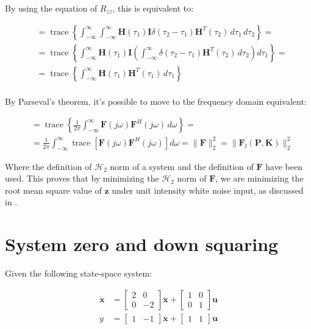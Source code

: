 \documentclass{scrreprt}
\begin{document}
By using the equation of $R_{zz}$, this is equivalent to:

\begin{align}
&= \operatorname{trace} \left\{ \int_{-\infty}^{\infty} \int_{-\infty}^{\infty} \mathbf{H}(\tau_1) \mathbf{I} \delta(\tau_2 - \tau_1) \mathbf{H}^T(\tau_2) \, d\tau_1 \, d\tau_2 \right\} = \\
&= \operatorname{trace} \left\{ \int_{-\infty}^{\infty} \mathbf{H}(\tau_1) \mathbf{I} \left( \int_{-\infty}^{\infty} \delta(\tau_2 - \tau_1) \mathbf{H}^T(\tau_2) \, d\tau_2 \right) d\tau_1 \right\} = \\
&= \operatorname{trace} \left\{ \int_{-\infty}^{\infty} \mathbf{H}(\tau_1) \mathbf{H}^T(\tau_1) \, d\tau_1 \right\} \\
\end{align}

By Parseval's theorem, it's possible to move to the frequency domain equivalent:

\begin{align}
&= \operatorname{trace} \left\{ \frac{1}{2\pi} \int_{-\infty}^{\infty} \mathbf{F}(j\omega) \mathbf{F}^H(j\omega) \, d\omega \right\} = \\
&= \frac{1}{2\pi} \int_{-\infty}^{\infty} \operatorname{trace} \left[ \mathbf{F}(j\omega) \mathbf{F}^H(j\omega) \right] d\omega = \|\mathbf{F}\|_2^2 = \|\mathbf{F}_l(\mathbf{P}, \mathbf{K})\|_2^2
\end{align}

Where the definition of $\mathcal{H}_2$ norm of a system and the definition of $\boldsymbol{F}$ have been used.
This proves that by minimizing the $\mathcal{H}_2$ norm of $\boldsymbol{F}$, we are minimizing the root mean square value of $\boldsymbol{z}$ under unit intensity white noise input, as discussed in \cite{Sko05}.


\section{System zero and down squaring}
Given the following state-space system:

\begin{align*}
\dot{\boldsymbol{x}} &= \begin{bmatrix} 2 & 0 \\ 0 & -2 \end{bmatrix} \boldsymbol{x} + \begin{bmatrix} 1 & 0 \\ 0 & 1 \end{bmatrix} \boldsymbol{u} \\
y &= \begin{bmatrix} 1 & -1 \end{bmatrix} \boldsymbol{x} + \begin{bmatrix} 1 & 1 \end{bmatrix} \boldsymbol{u}
\end{align*}
\end{document}
